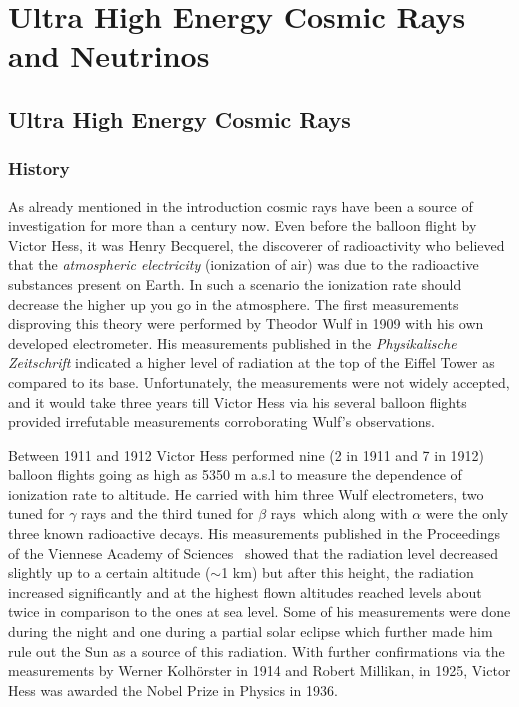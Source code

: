 
\chapter{Ultra High Energy Cosmic Rays and Neutrinos}
\label{chap:crnNu}

\section{Ultra High Energy Cosmic Rays}
\label{sec:UHECR}
\subsection{History}
\label{subsec:crhist}
As already mentioned in the introduction cosmic rays have been a source of investigation for more than a century now. Even before the balloon flight by Victor Hess, it was Henry Becquerel, the discoverer of radioactivity who believed that the \textit{atmospheric electricity} (ionization of air) was due to the radioactive substances present on Earth. In such a scenario the ionization rate should decrease the higher up you go in the atmosphere. The first measurements disproving this theory were performed by Theodor Wulf in 1909 with his own developed electrometer. His measurements published in the \textit{Physikalische Zeitschrift} indicated a higher level of radiation at the top of the Eiffel Tower as compared to its base. Unfortunately, the measurements were not widely accepted, and it would take three years till Victor Hess via his several balloon flights provided irrefutable measurements corroborating Wulf's observations.

Between 1911 and 1912 Victor Hess performed nine (2 in 1911 and 7 in 1912) balloon flights going as high as 5350 m a.s.l to measure the dependence of ionization rate to altitude. He carried with him three Wulf electrometers, two tuned for $\gamma$ rays and the third tuned for $\beta$ rays~\cite{hess2018observationspenetratingradiationseven}which along with $\alpha$ were the only three known radioactive decays. His measurements published in the Proceedings of the Viennese Academy of Sciences~\cite{Hess:1912srp} showed that the radiation level decreased slightly up to a certain altitude ($\sim$1 km) but after this height, the radiation increased significantly and at the highest flown altitudes reached levels about twice in comparison to the ones at sea level. Some of his measurements were done during the night and one during a partial solar eclipse which further made him rule out the Sun as a source of this radiation. With further confirmations via the measurements by Werner Kolhörster in 1914 and Robert Millikan, in 1925, Victor Hess was awarded the Nobel Prize in Physics in 1936. 

